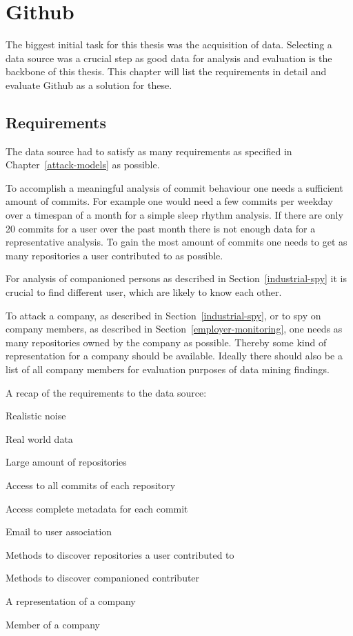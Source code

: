 \section{Github}\label{github}
The biggest initial task for this thesis was the acquisition of data.
Selecting a data source was a crucial step as good data for analysis and evaluation is the backbone of this thesis. This chapter will list the requirements in detail and evaluate Github as a solution for these.

\subsection{Requirements}
The data source had to satisfy as many requirements as specified in Chapter~\ref{attack-models} as possible.

To accomplish a meaningful analysis of commit behaviour one needs a sufficient amount of commits.
For example one would need a few commits per weekday over a timespan of a month for a simple sleep rhythm analysis.
If there are only 20 commits for a user over the past month there is not enough data for a representative analysis.
To gain the most amount of commits one needs to get as many repositories a user contributed to as possible.

For analysis of companioned persons as described in Section~\ref{industrial-spy} it is crucial to find different user, which are likely to know each other.

To attack a company, as described in Section~\ref{industrial-spy}, or to spy on company members, as described in Section~\ref{employer-monitoring}, one needs as many repositories owned by the company as possible.
Thereby some kind of representation for a company should be available.
Ideally there should also be a list of all company members for evaluation purposes of data mining findings.

\begin{itemlist}{A recap of the requirements to the data source:}
    \item Realistic noise
    \item Real world data
    \item Large amount of repositories
    \item Access to all commits of each repository
    \item Access complete metadata for each commit
    \item Email to user association
    \item Methods to discover repositories a user contributed to
    \item Methods to discover companioned contributer
    \item A representation of a company
    \item Member of a company
    \end{itemlist}


